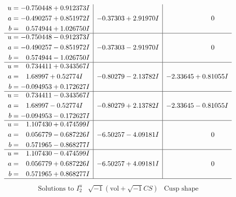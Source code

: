 \documentclass[1p]{elsarticle_modified}
\theoremstyle{definition}
\newcommand{\I}{\sqrt{-1}}
\begin{document}
$$\begin{array}{c|c|c}
\begin{aligned}
u &= -0.750448 + 0.912373 I \\
a &= -0.490257 + 0.851972 I \\
b &= \phantom{-}0.574944 + 1.026750 I\end{aligned}
 & -0.37303 + 2.91970 I & \phantom{-0.000000 } 0 \\ \hline\begin{aligned}
u &= -0.750448 - 0.912373 I \\
a &= -0.490257 - 0.851972 I \\
b &= \phantom{-}0.574944 - 1.026750 I\end{aligned}
 & -0.37303 - 2.91970 I & \phantom{-0.000000 } 0 \\ \hline\begin{aligned}
u &= \phantom{-}0.734411 + 0.343567 I \\
a &= \phantom{-}1.68997 + 0.52774 I \\
b &= -0.094953 + 0.172627 I\end{aligned}
 & -0.80279 - 2.13782 I & -2.33645 + 0.81055 I \\ \hline\begin{aligned}
u &= \phantom{-}0.734411 - 0.343567 I \\
a &= \phantom{-}1.68997 - 0.52774 I \\
b &= -0.094953 - 0.172627 I\end{aligned}
 & -0.80279 + 2.13782 I & -2.33645 - 0.81055 I \\ \hline\begin{aligned}
u &= \phantom{-}1.107430 + 0.474599 I \\
a &= \phantom{-}0.056779 - 0.687226 I \\
b &= \phantom{-}0.571965 - 0.868277 I\end{aligned}
 & -6.50257 - 4.09181 I & \phantom{-0.000000 } 0 \\ \hline\begin{aligned}
u &= \phantom{-}1.107430 - 0.474599 I \\
a &= \phantom{-}0.056779 + 0.687226 I \\
b &= \phantom{-}0.571965 + 0.868277 I\end{aligned}
 & -6.50257 + 4.09181 I & \phantom{-0.000000 } 0\\
 \hline 
 \end{array}$$\newpage$$\begin{array}{c|c|c}  
\text{Solutions to }I^u_{2}& \I (\text{vol} + \sqrt{-1}CS) & \text{Cusp shape}\\
 \hline 
\begin{aligned}

\end{aligned}
\end{array}$$
\end{document}
